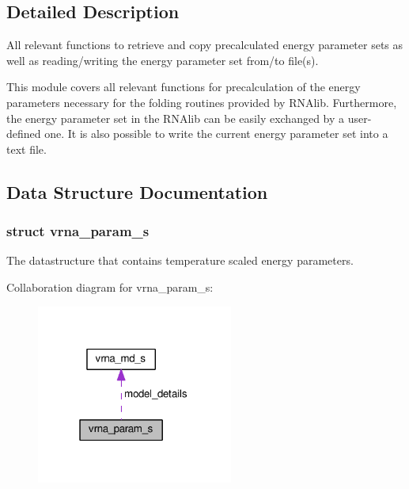 \subsection{Detailed Description}
All relevant functions to retrieve and copy precalculated energy parameter sets as well as reading/writing the energy parameter set from/to file(s). 

This module covers all relevant functions for precalculation of the energy parameters necessary for the folding routines provided by R\+N\+Alib. Furthermore, the energy parameter set in the R\+N\+Alib can be easily exchanged by a user-\/defined one. It is also possible to write the current energy parameter set into a text file. 

\subsection{Data Structure Documentation}
\label{structvrna__param__s}
\hypertarget{group__energy__parameters_structvrna__param__s}{}
\subsubsection{struct vrna\+\_\+param\+\_\+s}
The datastructure that contains temperature scaled energy parameters. 

Collaboration diagram for vrna\+\_\+param\+\_\+s\+:
\nopagebreak
\begin{figure}[H]
\begin{center}
\leavevmode
\includegraphics[width=183pt]{structvrna__param__s__coll__graph}
\end{center}
\end{figure}

